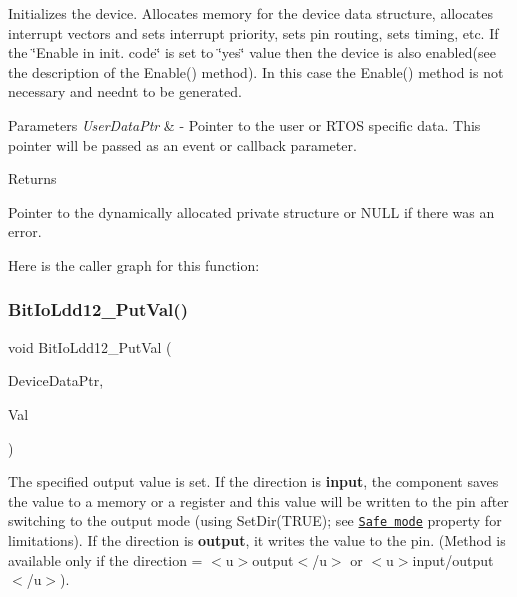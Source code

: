 Initializes the device. Allocates memory for the device data structure, allocates interrupt vectors and sets interrupt priority, sets pin routing, sets timing, etc. If the \char`\"{}\+Enable
    in init. code\char`\"{} is set to \char`\"{}yes\char`\"{} value then the device is also enabled(see the description of the Enable() method). In this case the Enable() method is not necessary and needn\textquotesingle{}t to be generated. 


\begin{DoxyParams}{Parameters}
{\em User\+Data\+Ptr} & -\/ Pointer to the user or R\+T\+OS specific data. This pointer will be passed as an event or callback parameter. \\
\hline
\end{DoxyParams}
\begin{DoxyReturn}{Returns}

\begin{DoxyItemize}
\item Pointer to the dynamically allocated private structure or N\+U\+LL if there was an error. 
\end{DoxyItemize}
\end{DoxyReturn}
Here is the caller graph for this function\+:
\mbox{\label{group___bit_io_ldd12__module_ga9db76c4359c6a7420209b0a4c6c4b940}} 
\subsubsection{\texorpdfstring{Bit\+Io\+Ldd12\+\_\+\+Put\+Val()}{BitIoLdd12\_PutVal()}}
{\footnotesize\ttfamily void Bit\+Io\+Ldd12\+\_\+\+Put\+Val (\begin{DoxyParamCaption}\item[{\hyperlink{group___p_e___types__module_gac5cf1362f1f0e3a2ce71b1bf2276d091}{L\+D\+D\+\_\+\+T\+Device\+Data} $\ast$}]{Device\+Data\+Ptr,  }\item[{\hyperlink{group___p_e___types__module_ga97a80ca1602ebf2303258971a2c938e2}{bool}}]{Val }\end{DoxyParamCaption})}



The specified output value is set. If the direction is {\bfseries  input}, the component saves the value to a memory or a register and this value will be written to the pin after switching to the output mode (using {\ttfamily Set\+Dir(\+T\+R\+U\+E)}; see \href{BitIOProperties.html#SafeMode}{\tt Safe mode} property for limitations). If the direction is {\bfseries output}, it writes the value to the pin. (Method is available only if the direction = $<$u$>${\ttfamily output}$<$/u$>$ or $<$u$>${\ttfamily  input/output}$<$/u$>$). 


